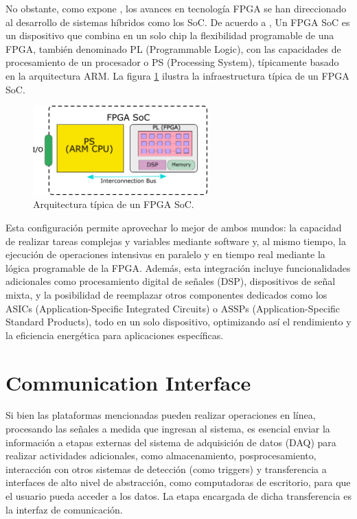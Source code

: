 \documentclass[]{book}
\begin{document}
\noindent No obstante, como expone \cite{bravo2020new}, los avances en tecnología FPGA se han direccionado al desarrollo de sistemas híbridos como los SoC. De acuerdo a \cite{amd_zynq_7000}, Un FPGA SoC es un dispositivo que combina en un solo chip la flexibilidad programable de una FPGA, también denominado PL (Programmable Logic), con las capacidades de procesamiento de un procesador o PS (Processing System), típicamente basado en la arquitectura ARM. La figura \ref{fig:fpga_soc} ilustra la infraestructura típica de un FPGA SoC. \\ 

\begin{figure}[h]
    \centering
    \includegraphics[width=0.6\textwidth]{FPGA_SoC.png}
    \caption{Arquitectura típica de un FPGA SoC.}
    \label{fig:fpga_soc}

\end{figure}

\noindent Esta configuración permite aprovechar lo mejor de ambos mundos: la capacidad de realizar tareas complejas y variables mediante software y, al mismo tiempo, la ejecución de operaciones intensivas en paralelo y en tiempo real mediante la lógica programable de la FPGA. Además, esta integración incluye funcionalidades adicionales como procesamiento digital de señales (DSP), dispositivos de señal mixta, y la posibilidad de reemplazar otros componentes dedicados como los ASICs (Application-Specific Integrated Circuits) o ASSPs (Application-Specific Standard Products), todo en un solo dispositivo, optimizando así el rendimiento y la eficiencia energética para aplicaciones específicas.\\

\section{Communication Interface}
\label{sec:communication_interface}

\noindent Si bien las plataformas mencionadas pueden realizar operaciones en línea, procesando las señales a medida que ingresan al sistema, es esencial enviar la información a etapas externas del sistema de adquisición de datos (DAQ) para realizar actividades adicionales, como almacenamiento, posprocesamiento, interacción con otros sistemas de detección (como triggers) y transferencia a interfaces de alto nivel de abstracción, como computadoras de escritorio, para que el usuario pueda acceder a los datos. La etapa encargada de dicha transferencia es la interfaz de comunicación. \\
\end{document}
